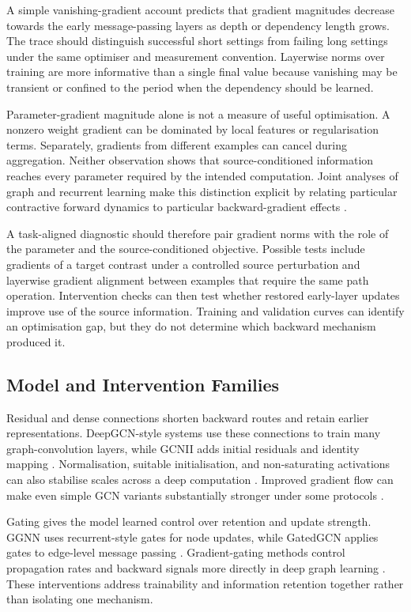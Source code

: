 A simple vanishing-gradient account predicts that gradient magnitudes decrease towards the early message-passing layers as depth or dependency length grows.
The trace should distinguish successful short settings from failing long settings under the same optimiser and measurement convention.
Layerwise norms over training are more informative than a single final value because vanishing may be transient or confined to the period when the dependency should be learned.

Parameter-gradient magnitude alone is not a measure of useful optimisation.
A nonzero weight gradient can be dominated by local features or regularisation terms.
Separately, gradients from different examples can cancel during aggregation.
Neither observation shows that source-conditioned information reaches every parameter required by the intended computation.
Joint analyses of graph and recurrent learning make this distinction explicit by relating particular contractive forward dynamics to particular backward-gradient effects \cite{arroyo2025vanishing}.

A task-aligned diagnostic should therefore pair gradient norms with the role of the parameter and the source-conditioned objective.
Possible tests include gradients of a target contrast under a controlled source perturbation and layerwise gradient alignment between examples that require the same path operation.
Intervention checks can then test whether restored early-layer updates improve use of the source information.
Training and validation curves can identify an optimisation gap, but they do not determine which backward mechanism produced it.

\subsection{Model and Intervention Families}

Residual and dense connections shorten backward routes and retain earlier representations.
DeepGCN-style systems use these connections to train many graph-convolution layers, while GCNII adds initial residuals and identity mapping \cite{li2019deepgcns,chen2020simple}.
Normalisation, suitable initialisation, and non-saturating activations can also stabilise scales across a deep computation \cite{ioffe2015batch,glorot2010difficulty}.
Improved gradient flow can make even simple GCN variants substantially stronger under some protocols \cite{jaiswal2022old}.

Gating gives the model learned control over retention and update strength.
GGNN uses recurrent-style gates for node updates, while GatedGCN applies gates to edge-level message passing \cite{li2016ggnn,bresson2017residual}.
Gradient-gating methods control propagation rates and backward signals more directly in deep graph learning \cite{rusch2023gradient}.
These interventions address trainability and information retention together rather than isolating one mechanism.

